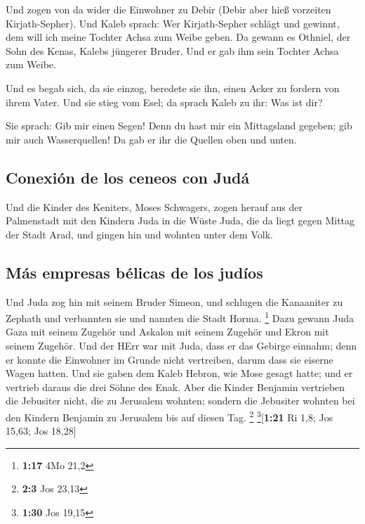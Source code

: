  Und zogen von da wider die Einwohner zu Debir (Debir
aber hieß vorzeiten Kirjath-Sepher).  Und Kaleb sprach:
Wer Kirjath-Sepher schlägt und gewinnt, dem will ich meine Tochter Achsa
zum Weibe geben.  Da gewann es Othniel, der Sohn des
Kenas, Kalebs jüngerer Bruder. Und er gab ihm sein Tochter Achsa zum
Weibe.

 Und es begab sich, da sie einzog, beredete sie ihn,
einen Acker zu fordern von ihrem Vater. Und sie stieg vom Esel; da
sprach Kaleb zu ihr: Was ist dir?

 Sie sprach: Gib mir einen Segen! Denn du hast mir ein
Mittagsland gegeben; gib mir auch Wasserquellen! Da gab er ihr die
Quellen oben und unten.

\hypertarget{conexiuxf3n-de-los-ceneos-con-juduxe1}{%
\subsection{Conexión de los ceneos con
Judá}\label{conexiuxf3n-de-los-ceneos-con-juduxe1}}

 Und die Kinder des Keniters, Moses Schwagers, zogen
herauf aus der Palmenstadt mit den Kindern Juda in die Wüste Juda, die
da liegt gegen Mittag der Stadt Arad, und gingen hin und wohnten unter
dem Volk.

\hypertarget{muxe1s-empresas-buxe9licas-de-los-juduxedos}{%
\subsection{Más empresas bélicas de los
judíos}\label{muxe1s-empresas-buxe9licas-de-los-juduxedos}}

 Und Juda zog hin mit seinem Bruder Simeon, und schlugen
die Kanaaniter zu Zephath und verbannten sie und nannten die Stadt
Horma. \footnote{\textbf{1:17} 4Mo 21,2}  Dazu gewann
Juda Gaza mit seinem Zugehör und Askalon mit seinem Zugehör und Ekron
mit seinem Zugehör.  Und der HErr war mit Juda, dass er
das Gebirge einnahm; denn er konnte die Einwohner im Grunde nicht
vertreiben, darum dass sie eiserne Wagen hatten.  Und sie
gaben dem Kaleb Hebron, wie Mose gesagt hatte; und er vertrieb daraus
die drei Söhne des Enak.  Aber die Kinder Benjamin
vertrieben die Jebusiter nicht, die zu Jerusalem wohnten; sondern die
Jebusiter wohnten bei den Kindern Benjamin zu Jerusalem bis auf diesen
Tag. \footnote{\textbf{2:3} Jos 23,13} \footnote{\textbf{1:30} Jos 19,15}{[}\textbf{1:21}
Ri 1,8; Jos 15,63; Jos 18,28{]}

